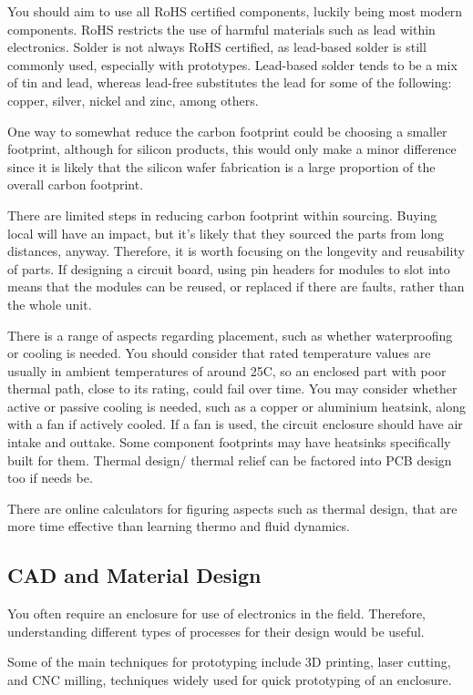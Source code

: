 \documentclass[a4paper,11pt]{report}
\begin{document}
You should aim to use all RoHS certified components, luckily being most modern components. RoHS restricts the use of harmful materials such as lead within electronics. Solder is not always RoHS certified, as lead-based solder is still commonly used, especially with prototypes. Lead-based solder tends to be a mix of tin and lead, whereas lead-free substitutes the lead for some of the following: copper, silver, nickel and zinc, among others.

One way to somewhat reduce the carbon footprint could be choosing a smaller footprint, although for silicon products, this would only make a minor difference since it is likely that the silicon wafer fabrication is a large proportion of the overall carbon footprint.

There are limited steps in reducing carbon footprint within sourcing. Buying local will have an impact, but it's likely that they sourced the parts from long distances, anyway. Therefore, it is worth focusing on the longevity and reusability of parts. If designing a circuit board, using pin headers for modules to slot into means that the modules can be reused, or replaced if there are faults, rather than the whole unit.

There is a range of aspects regarding placement, such as whether waterproofing or cooling is needed. You should consider that rated temperature values are usually in ambient temperatures of around 25\degree C, so an enclosed part with poor thermal path, close to its rating, could fail over time. You may consider whether active or passive cooling is needed, such as a copper or aluminium heatsink, along with a fan if actively cooled. If a fan is used, the circuit enclosure should have air intake and outtake. Some component footprints may have heatsinks specifically built for them. Thermal design/ thermal relief can be factored into PCB design too if needs be.

There are online calculators for figuring aspects such as thermal design, that are more time effective than learning thermo and fluid dynamics.

\subsection{CAD and Material Design}

You often require an enclosure for use of electronics in the field. Therefore, understanding different types of processes for their design would be useful.

Some of the main techniques for prototyping include 3D printing, laser cutting, and CNC milling, techniques widely used for quick prototyping of an enclosure.
\end{document}
